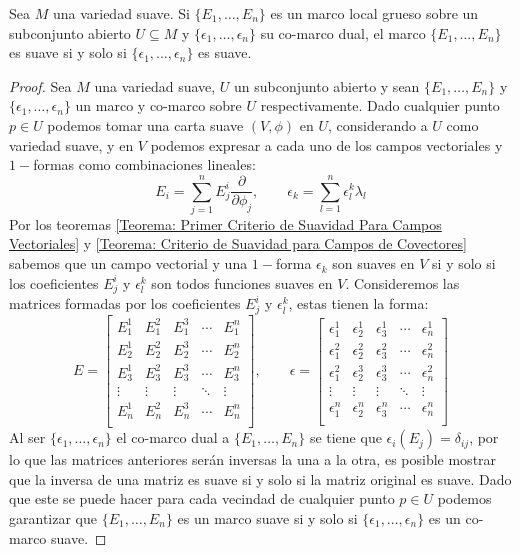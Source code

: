 \begin{lemma}
	Sea $M$ una variedad suave. Si $\{E_1,\ldots,E_n\}$ es un marco local grueso sobre un subconjunto abierto $U \subseteq M$ y $\{\epsilon_1,\ldots,\epsilon_n\}$ su co-marco dual, el marco $\{E_1,\ldots,E_n\}$ es suave si y solo si $\{\epsilon_1,\ldots, \epsilon_n\}$ es suave.
\end{lemma}

\begin{proof}
	Sea $M$ una variedad suave, $U$ un subconjunto abierto y sean $\{E_1, \ldots, E_n\}$ y $\{\epsilon_1,\ldots,\epsilon_n\}$ un marco y co-marco sobre $U$ respectivamente. Dado cualquier punto $p \in U$ podemos tomar una carta suave $(V,\phi)$ en $U$, considerando a $U$ como variedad suave, y en $V$ podemos expresar a cada uno de los campos vectoriales y $1-$formas como combinaciones lineales:
	\[
		E_i = \sum_{j=1}^{n} E_j^i\frac{\partial}{\partial \phi_j},
		\quad\quad
		\epsilon_k = \sum_{l=1}^{n} \epsilon_l^k \lambda_l
	\]
	Por los teoremas \ref{Teorema: Primer Criterio de Suavidad Para Campos Vectoriales} y \ref{Teorema: Criterio de Suavidad para Campos de Covectores} sabemos que un campo vectorial y una $1-$forma $\epsilon_k$ son suaves en $V$ si y solo si los coeficientes $E_j^i$ y $\epsilon_l^k$ son todos funciones suaves en $V$. Consideremos las matrices formadas por los coeficientes $E_j^i$ y $\epsilon_l^k$, estas tienen la forma:
	\[
		E = \begin{bmatrix}
			E_1^1  & E_1^2  & E_1^3  & \cdots & E_1^n  \\[10pt]
			E_2^1  & E_2^2  & E_2^3  & \cdots & E_2^n  \\[10pt]
			E_3^1  & E_3^2  & E_3^3  & \cdots & E_3^n  \\[10pt]
			\vdots & \vdots & \vdots & \ddots & \vdots \\[10pt]
			E_n^1  & E_n^2  & E_n^3  & \cdots & E_n^n  \\[10pt]
		\end{bmatrix},
		\quad\quad
		\epsilon = \begin{bmatrix}
			\epsilon_1^1 & \epsilon_2^1 & \epsilon_3^1 & \cdots & \epsilon_n^1 \\[10pt]
			\epsilon_1^2 & \epsilon_2^2 & \epsilon_3^2 & \cdots & \epsilon_n^2 \\[10pt]
			\epsilon_1^2 & \epsilon_2^3 & \epsilon_3^3 & \cdots & \epsilon_n^2 \\[10pt]
			\vdots       & \vdots       & \vdots       & \ddots & \vdots       \\[10pt]
			\epsilon_1^n & \epsilon_2^n & \epsilon_3^n & \cdots & \epsilon_n^n \\[10pt]
		\end{bmatrix}
	\]
	Al ser  $\{\epsilon_1,\ldots,\epsilon_n\}$ el co-marco dual a $\{E_1,\ldots,E_n\}$ se tiene que $\epsilon_i(E_j) = \delta_{ij}$, por lo que las matrices anteriores serán inversas la una a la otra, es posible mostrar que la inversa de una matriz es suave si y solo si la matriz original es suave. Dado que este se puede hacer para cada vecindad de cualquier punto $p \in U$ podemos garantizar que $\{E_1,\ldots,E_n\}$ es un marco suave si y solo si $\{\epsilon_1,\ldots,\epsilon_n\}$ es un co-marco suave.
\end{proof}

